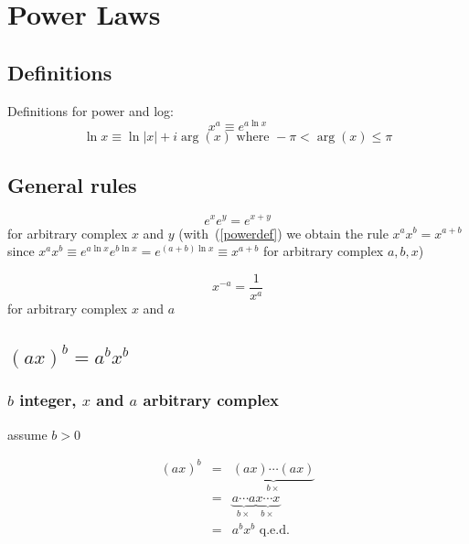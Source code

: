 \documentclass{article}
\begin{document}
\section{Power Laws}

\subsection{Definitions}

Definitions for power and log:
\begin{equation}\label{powerdef}
x^a \equiv e^{a \ln x}
\end{equation}
\begin{equation}
\ln x \equiv \ln |x| + i \arg(x) \mbox{ where } -\pi < \arg(x) \le \pi
\end{equation}

\subsection{General rules}

\begin{equation}
e^x e^y = e^{x+y}
\end{equation}
for arbitrary complex \(x\) and \(y\) (with~(\ref{powerdef}) we obtain
the rule \(x^ax^b=x^{a+b}\) since \(x^ax^b\equiv e^{a\ln x}e^{b\ln x} = 
e^{(a+b)\ln x}\equiv x^{a+b}\) for arbitrary complex \(a,b,x\))

\begin{equation}
x^{-a} = \frac{1}{x^a}
\end{equation}
for arbitrary complex \(x\) and \(a\)

\subsection{\((ax)^b=a^b x^b\)}

\subsubsection{\(b\) integer, \(x\) and \(a\) arbitrary complex}

assume \(b>0\)

\begin{eqnarray}
(ax)^b & = & \underbrace{(ax) \cdots (ax)}_{b \times}
\nonumber\\
& = & \underbrace{a \cdots a}_{b \times}
      \underbrace{x \cdots x}_{b \times}
\nonumber\\
& = & a^b x^b \mbox{ q.e.d.}
\end{eqnarray}
\end{document}
